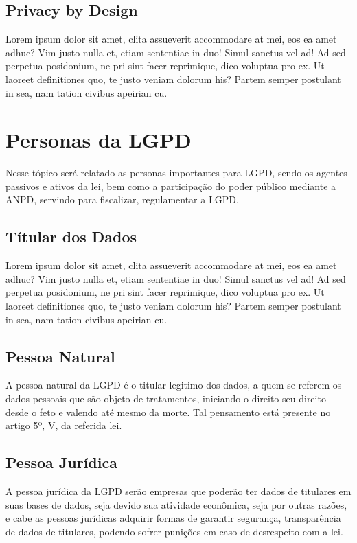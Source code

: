 \documentclass[
	12pt,				%
	openright,			%
	oneside,			%
	a4paper,			%
	english,			%
	french,				%
	spanish,			%
	brazil,				%
	]{abntex2}
\begin{document}
\subsection{Privacy by Design}

Lorem ipsum dolor sit amet, clita assueverit accommodare at mei, eos ea amet adhuc? Vim justo nulla et, etiam sententiae in duo! Simul sanctus vel ad! Ad sed perpetua posidonium, ne pri sint facer reprimique, dico voluptua pro ex. Ut laoreet definitiones quo, te justo veniam dolorum his? Partem semper postulant in sea, nam tation civibus apeirian cu.

\section{Personas da LGPD}
\label{sec: exemplo}

Nesse tópico será relatado as personas importantes para LGPD, sendo os agentes passivos e ativos da lei, bem como a participação do poder público mediante a ANPD, servindo para fiscalizar, regulamentar a LGPD.


\subsection{Títular dos Dados}

Lorem ipsum dolor sit amet, clita assueverit accommodare at mei, eos ea amet adhuc? Vim justo nulla et, etiam sententiae in duo! Simul sanctus vel ad! Ad sed perpetua posidonium, ne pri sint facer reprimique, dico voluptua pro ex. Ut laoreet definitiones quo, te justo veniam dolorum his? Partem semper postulant in sea, nam tation civibus apeirian cu.



\subsection{Pessoa Natural}

A pessoa natural da LGPD é o titular legitimo dos dados, a quem se referem os dados pessoais que são objeto de tratamentos, iniciando o direito seu direito desde o feto e valendo até mesmo da morte. Tal pensamento está presente no artigo 5º, V, da referida lei.

\subsection{Pessoa Jurídica}

A pessoa jurídica da LGPD serão empresas que poderão ter dados de titulares em suas bases de dados, seja devido sua atividade econômica, seja por outras razões, e cabe as pessoas jurídicas adquirir formas de garantir segurança, transparência de dados de titulares, podendo sofrer punições em caso de desrespeito com a lei.
\end{document}
